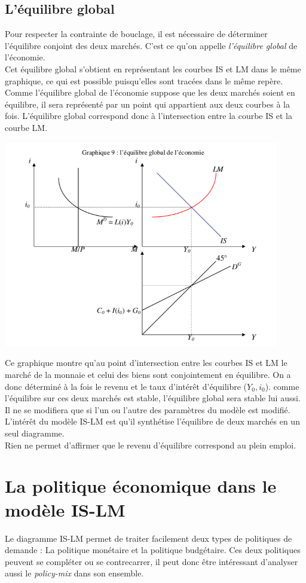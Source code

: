 \documentclass[10pt]{book}
\begin{document}
\subsection{L'équilibre global}
Pour respecter la contrainte de bouclage, il est nécessaire de déterminer l'équilibre conjoint des deux marchés. C'est ce qu'on appelle \textit{l'équilibre global} de l'économie. \\
Cet équilibre global s'obtient en représentant les courbes IS et LM dans le même graphique, ce qui est possible puisqu'elles sont tracées dans le même repère. Comme l'équilibre global de l'économie suppose que les deux marchés soient en équilibre, il sera représenté par un point qui appartient aux deux courbes à la fois. L'équilibre global correspond donc à l'intersection entre la courbe IS et la courbe LM.
\begin{center}
  \includegraphics[width=12cm]{graph32.png}
\end{center}
Ce graphique montre qu'au point d'intersection entre les courbes IS et LM le marché de la monnaie et celui des biens sont conjointement en équilibre. On a donc déterminé à la fois le revenu et le taux d'intérêt d'équilibre ($Y_0,i_0$). comme l'équilibre sur ces deux marchés est stable, l'équilibre global sera stable lui aussi. Il ne se modifiera que si l'un ou l'autre des paramètres du modèle est modifié. \\
L'intérêt du modèle IS-LM est qu'il synthétise l'équilibre de deux marchés en un seul diagramme. \\
Rien ne permet d'affirmer que le revenu d'équilibre correspond au plein emploi.

\section{La politique économique dans le modèle IS-LM}
Le diagramme IS-LM permet de traiter facilement deux types de politiques de demande : La politique monétaire et la politique budgétaire. Ces deux politiques peuvent se compléter ou se contrecarrer, il peut donc être intéressant d'analyser aussi le \textit{policy-mix} dans son ensemble.
\end{document}
